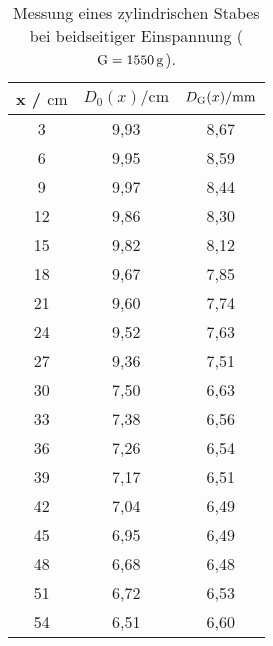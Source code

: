 \sloppy
\begin{table}[H]
  \centering
  \caption{Messung eines zylindrischen Stabes bei beidseitiger Einspannung ($\text G = \SI{1550}{\gram}$).}
  \label{tab:werte4}
  \begin{tabular}{c c c}
    \toprule
    x / $\si{\centi\meter} $ & $ D_0(x) / \si{\centi\meter}$ & $D_{\text G}(x) / \si{\milli\meter}$ \\
    \midrule
    3 & 9,93 & 8,67 \\
    6 & 9,95 & 8,59 \\
    9 & 9,97 & 8,44 \\
    12 & 9,86 & 8,30 \\
    15 & 9,82 & 8,12 \\
    18 & 9,67 & 7,85 \\
    21 & 9,60 & 7,74 \\
    24 & 9,52 & 7,63 \\
    27 & 9,36 & 7,51 \\
    30 & 7,50 & 6,63 \\
    33 & 7,38 & 6,56 \\
    36 & 7,26 & 6,54 \\
    39 & 7,17 & 6,51 \\
    42 & 7,04 & 6,49 \\
    45 & 6,95 & 6,49 \\
    48 & 6,68 & 6,48 \\
    51 & 6,72 & 6,53 \\
    54 & 6,51 & 6,60 \\
    \bottomrule
  \end{tabular}
\end{table}